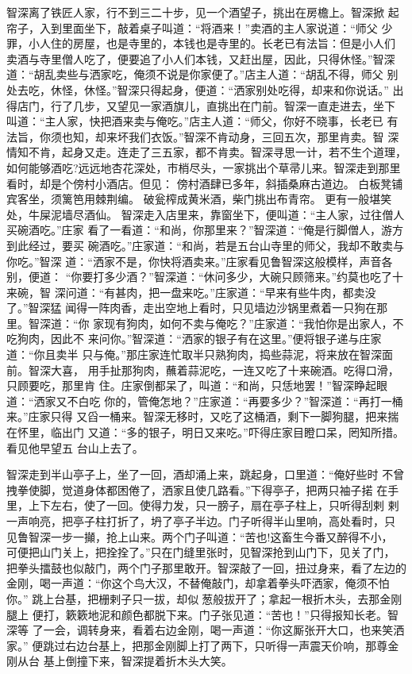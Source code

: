 智深离了铁匠人家，行不到三二十步，见一个酒望子，挑出在房檐上。智深掀
起帘子，入到里面坐下，敲着桌子叫道：“将酒来！”卖酒的主人家说道：“师父
少罪，小人住的房屋，也是寺里的，本钱也是寺里的。长老已有法旨：但是小人们
卖酒与寺里僧人吃了，便要追了小人们本钱，又赶出屋，因此，只得休怪。”智深
道：“胡乱卖些与洒家吃，俺须不说是你家便了。”店主人道：“胡乱不得，师父
别处去吃，休怪，休怪。”智深只得起身，便道：“洒家别处吃得，却来和你说话。”
出得店门，行了几步，又望见一家酒旗儿，直挑出在门前。智深一直走进去，坐下
叫道：“主人家，快把酒来卖与俺吃。”店主人道：“师父，你好不晓事，长老已
有法旨，你须也知，却来坏我们衣饭。”智深不肯动身，三回五次，那里肯卖。智
深情知不肯，起身又走。连走了三五家，都不肯卖。智深寻思一计，若不生个道理，
如何能够酒吃?远远地杏花深处，市梢尽头，一家挑出个草帚儿来。智深走到那里
看时，却是个傍村小酒店。但见：
傍村酒肆已多年，斜插桑麻古道边。
白板凳铺宾客坐，须篱笆用棘荆编。
破瓮榨成黄米酒，柴门挑出布青帘。
更有一般堪笑处，牛屎泥墙尽酒仙。
智深走入店里来，靠窗坐下，便叫道：“主人家，过往僧人买碗酒吃。”庄家
看了一看道：“和尚，你那里来？”智深道：“俺是行脚僧人，游方到此经过，要买
碗酒吃。”庄家道：“和尚，若是五台山寺里的师父，我却不敢卖与你吃。”智深
道：“洒家不是，你快将酒卖来。”庄家看见鲁智深这般模样，声音各别，便道：
“你要打多少酒？”智深道：“休问多少，大碗只顾筛来。”约莫也吃了十来碗，智
深问道：“有甚肉，把一盘来吃。”庄家道：“早来有些牛肉，都卖没了。”智深猛
闻得一阵肉香，走出空地上看时，只见墙边沙锅里煮着一只狗在那里。智深道：“你
家现有狗肉，如何不卖与俺吃？”庄家道：“我怕你是出家人，不吃狗肉，因此不
来问你。”智深道：“洒家的银子有在这里。”便将银子递与庄家道：“你且卖半
只与俺。”那庄家连忙取半只熟狗肉，捣些蒜泥，将来放在智深面前。智深大喜，
用手扯那狗肉，蘸着蒜泥吃，一连又吃了十来碗酒。吃得口滑，只顾要吃，那里肯
住。庄家倒都呆了，叫道：“和尚，只恁地罢！”智深睁起眼道：“洒家又不白吃
你的，管俺怎地？”庄家道：“再要多少？”智深道：“再打一桶来。”庄家只得
又舀一桶来。智深无移时，又吃了这桶酒，剩下一脚狗腿，把来揣在怀里，临出门
又道：“多的银子，明日又来吃。”吓得庄家目瞪口呆，罔知所措。看见他早望五
台山上去了。

智深走到半山亭子上，坐了一回，酒却涌上来，跳起身，口里道：“俺好些时
不曾拽拳使脚，觉道身体都困倦了，洒家且使几路看。”下得亭子，把两只袖子掿
在手里，上下左右，使了一回。使得力发，只一膀子，扇在亭子柱上，只听得刮剌
剌一声响亮，把亭子柱打折了，坍了亭子半边。门子听得半山里响，高处看时，只
见鲁智深一步一攧，抢上山来。两个门子叫道：“苦也!这畜生今番又醉得不小，
可便把山门关上，把拴拴了。”只在门缝里张时，见智深抢到山门下，见关了门，
把拳头擂鼓也似敲门，两个门子那里敢开。智深敲了一回，扭过身来，看了左边的
金刚，喝一声道：“你这个鸟大汉，不替俺敲门，却拿着拳头吓洒家，俺须不怕你。”
跳上台基，把栅剌子只一拔，却似葱般拔开了；拿起一根折木头，去那金刚腿上
便打，簌簌地泥和颜色都脱下来。门子张见道：“苦也！”只得报知长老。智深等
了一会，调转身来，看着右边金刚，喝一声道：“你这厮张开大口，也来笑洒家。”
便跳过右边台基上，把那金刚脚上打了两下，只听得一声震天价响，那尊金刚从台
基上倒撞下来，智深提着折木头大笑。

